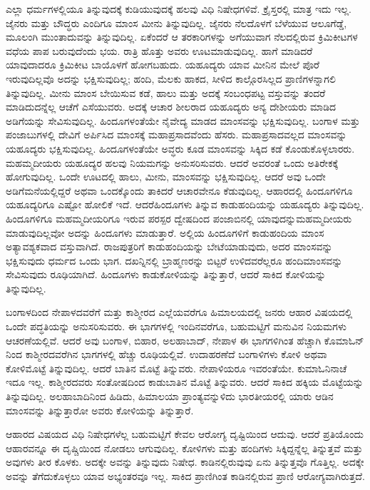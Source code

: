 ಎಲ್ಲಾ ಧರ್ಮಗಳಲ್ಲಿಯೂ ತಿನ್ನುವುದಕ್ಕೆ ಕುಡಿಯುವುದಕ್ಕೆ ಹಲವು ವಿಧಿ ನಿಷೇಧಗಳಿವೆ. ಕ್ರೈಸ್ತರಲ್ಲಿ ಮಾತ್ರ ಇದು ಇಲ್ಲ. ಜೈನರು ಮತ್ತು ಬೌದ್ಧರು ಎಂದಿಗೂ ಮಾಂಸ ಮೀನು ತಿನ್ನುವುದಿಲ್ಲ. ಜೈನರು ನೆಲದೊಳಗೆ ಬೆಳೆಯುವ ಆಲೂಗೆಡ್ಡೆ, ಮೂಲಂಗಿ ಮುಂತಾದುವನ್ನು ತಿನ್ನುವುದಿಲ್ಲ. ಏಕೆಂದರೆ ಆ ತರಕಾರಿಗಳನ್ನು ಅಗೆಯುವಾಗ ನೆಲದಲ್ಲಿರುವ ಕ್ರಿಮಿಕೀಟಗಳ ವಧೆಯ ಪಾಪ ಬರುವುದೆಂದು ಭಯ. ರಾತ್ರಿ ಹೊತ್ತು ಅವರು ಊಟಮಾಡುವುದಿಲ್ಲ. ಹಾಗೆ ಮಾಡಿದರೆ ಯಾವುದಾದರೂ ಕ್ರಿಮಿಕೀಟ ಬಾಯೊಳಗೆ ಹೋಗಬಹುದು. ಯಹೂದ್ಯರು ಯಾವ ಮೀನಿನ ಮೇಲೆ ಪೊರೆ ಇರುವುದಿಲ್ಲವೊ ಅದನ್ನು ಭಕ್ಷಿಸುವುದಿಲ್ಲ; ಹಂದಿ, ಮೆಲಕು ಹಾಕದ, ಸೀಳಿದ ಕಾಲ್ಗೊರಸಿಲ್ಲದ ಪ್ರಾಣಿಗಳನ್ನಾಗಲಿ ತಿನ್ನುವುದಿಲ್ಲ. ಮೀನು ಮಾಂಸ ಬೇಯಿಸುವ ಕಡೆ, ಹಾಲು ಮತ್ತು ಅದಕ್ಕೆ ಸಂಬಂಧಪಟ್ಟ ವಸ್ತುವನ್ನು ತಂದರೆ ಮಾಡಿದುದನ್ನೆಲ್ಲ ಆಚೆಗೆ ಎಸೆಯುವರು. ಅದಕ್ಕೆ ಆಚಾರ ಶೀಲರಾದ ಯಹೂದ್ಯರು ಅನ್ಯ ದೇಶೀಯರು ಮಾಡಿದ ಅಡಿಗೆಯನ್ನು ಸೇವಿಸುವುದಿಲ್ಲ. ಹಿಂದೂಗಳಂತೆಯೇ ನೈವೇದ್ಯ ಮಾಡದ ಮಾಂಸವನ್ನು ಭಕ್ಷಿಸುವುದಿಲ್ಲ. ಬಂಗಾಳ ಮತ್ತು ಪಂಜಾಬುಗಳಲ್ಲಿ ದೇವಿಗೆ ಅರ್ಪಿಸಿದ ಮಾಂಸಕ್ಕೆ ಮಹಾಪ್ರಸಾದವೆಂದು ಹೆಸರು. ಮಹಾಪ್ರಸಾದವಲ್ಲದ ಮಾಂಸವನ್ನು ಯಹೂದ್ಯರು ಭಕ್ಷಿಸುವುದಿಲ್ಲ. ಹಿಂದೂಗಳಂತೆಯೇ ಅವ್ಧರು ಕೂಡ ಮಾಂಸವನ್ನು ಸಿಕ್ಕಿದ ಕಡೆ ಕೊಂಡುಕೊಳ್ಳಲಾರರು. ಮಹಮ್ಮದೀಯರು ಯಹೂದ್ಯರ ಹಲವು ನಿಯಮಗನ್ನು ಅನುಸರಿಸುವರು. ಆದರೆ ಅವರಂತೆ ಒಂದು ಅತಿರೇಕಕ್ಕೆ ಹೋಗುವುದಿಲ್ಲ. ಒಂದೇ ಊಟದಲ್ಲಿ ಹಾಲು, ಮೀನು, ಮಾಂಸವನ್ನು ಭಕ್ಷಿಸುವುದಿಲ್ಲ. ಆದರೆ ಅವು ಒಂದೇ ಅಡಿಗೆಮನೆಯಲ್ಲಿದ್ದರೆ ಅಥವಾ ಒಂದಕ್ಕೊಂದು ತಾಕಿದರೆ ಆಚಾರವೇನೂ ಕೆಡುವುದಿಲ್ಲ. ಆಹಾರದಲ್ಲಿ ಹಿಂದೂಗಳಿಗೂ ಯಹೂದ್ಯರಿಗೂ ಎಷ್ಟೋ ಹೋಲಿಕೆ ಇದೆ. ಆದರೆ\break ಹಿಂದೂಗಳು ತಿನ್ನುವ ಕಾಡುಹಂದಿಯನ್ನು ಯಹೂದ್ಯರು ತಿನ್ನುವುದಿಲ್ಲ. ಹಿಂದೂಗಳಿಗೂ ಮಹಮ್ಮದೀಯರಿಗೂ ಇರುವ ಪರಸ್ಪರ ದ್ವೇಷದಿಂದ ಪಂಜಾಬಿನಲ್ಲಿ ಯಾವುದನ್ನು\break ಮಹಮ್ಮದೀಯರು ಮಾಡುವುದಿಲ್ಲವೋ ಅದನ್ನು ಹಿಂದೂಗಳು ಮಾಡುತ್ತಾರೆ. ಅಲ್ಲಿಯ ಹಿಂದೂಗಳಿಗೆ ಕಾಡುಹಂದಿಯ ಮಾಂಸ ಅತ್ಯಾವಶ್ಯಕವಾದ ವಸ್ತುವಾಗಿದೆ. ರಾಜಪುತ್ರರಿಗೆ ಕಾಡುಹಂದಿಯನ್ನು ಬೇಟೆಯಾಡುವುದು, ಅದರ ಮಾಂಸವನ್ನು ಭಕ್ಷಿಸುವುದು ಧರ್ಮದ ಒಂದು ಭಾಗ. ದಖನ್ನಿನಲ್ಲಿ ಬ್ರಾಹ್ಮಣರನ್ನು ಬಿಟ್ಟರೆ ಉಳಿದವರೆಲ್ಲರೂ ಹಂದಿಮಾಂಸವನ್ನು ಸೇವಿಸುವುದು ರೂಢಿಯಾಗಿದೆ. ಹಿಂದೂಗಳು ಕಾಡುಕೋಳಿಯನ್ನು ತಿನ್ನುತ್ತಾರೆ, ಆದರೆ ಸಾಕಿದ ಕೋಳಿಯನ್ನು ತಿನ್ನುವುದಿಲ್ಲ.

ಬಂಗಾಳದಿಂದ ನೇಪಾಳದವರೆಗೆ ಮತ್ತು ಕಾಶ್ಮೀರದ ಎಲ್ಲೆಯವರೆಗೂ ಹಿಮಾಲಯದಲ್ಲಿ ಜನರು ಆಹಾರ ವಿಷಯದಲ್ಲಿ ಒಂದೇ ಪದ್ಧತಿಯನ್ನು ಅನುಸರಿಸುವರು. ಈ ಭಾಗಗಳಲ್ಲಿ ಇಂದಿನವರೆಗೂ, ಬಹುಮಟ್ಟಿಗೆ ಮನುವಿನ ನಿಯಮಗಳು ಆಚರಣೆಯಲ್ಲಿವೆ. ಆದರೆ ಅವು ಬಂಗಾಳ, ಬಿಹಾರ, ಅಲಹಾಬಾದ್​, ನೇಪಾಳ ಈ ಭಾಗಗಳಿಗಿಂತ ಹೆಚ್ಚಾಗಿ ಕೊಮಾಓನ್​ನಿಂದ ಕಾಶ್ಮೀರದವರೆಗಿನ ಭಾಗಗಳಲ್ಲಿ ಹೆಚ್ಚು ರೂಢಿಯಲ್ಲಿವೆ. ಉದಾಹರಣೆದೆ ಬಂಗಾಳಿಗಳು ಕೋಳಿ ಅಥವಾ ಕೋಳಿಮೊಟ್ಟೆ ತಿನ್ನುವುದಿಲ್ಲ. ಆದರೆ ಬಾತಿನ ಮೊಟ್ಟೆ ತಿನ್ನುವರು. ನೇಪಾಳಿಯರೂ ಇವರಂತೆಯೇ. ಕುಮಾಓನಿನಾಚೆ ಇದೂ ಇಲ್ಲ. ಕಾಶ್ಮೀರ\break ದವರು ಸಂತೋಷದಿಂದ ಕಾಡುಬಾತಿನ ಮೊಟ್ಟೆ ತಿನ್ನುವರು. ಆದರೆ ಸಾಕಿದ ಹಕ್ಕಿಯ ಮೊಟ್ಟೆಯನ್ನು ತಿನ್ನುವುದಿಲ್ಲ. ಅಲಹಾಬಾದಿನಿಂದ ಹಿಡಿದು, ಹಿಮಾಲಯಾ ಪ್ರಾಂತ್ಯವನ್ನು\break ಳಿದು ಭಾರತೀಯರಲ್ಲಿ ಯಾರು ಆಡಿನ ಮಾಂಸವನ್ನು ತಿನ್ನುತ್ತಾರೋ ಅವರು ಕೋಳಿಯನ್ನು ತಿನ್ನುತ್ತಾರೆ.

ಆಹಾರದ ವಿಷಯದ ವಿಧಿ ನಿಷೇಧಗಳೆಲ್ಲ ಬಹುಮಟ್ಟಿಗೆ ಕೇವಲ ಆರೋಗ್ಯ ದೃಷ್ಟಿಯಿಂದ ಆದುವು. ಆದರೆ ಪ್ರತಿಯೊಂದು ಆಹಾರವನ್ನೂ ಈ ದೃಷ್ಚಿಯಿಂದ ನೋಡಲು ಆಗುವುದಿಲ್ಲ. ಕೋಳಿಗಳು ಮತ್ತು ಹಂದಿಗಳು ಸಿಕ್ಕಿದ್ದನ್ನೆಲ್ಲ ತಿನ್ನುತ್ತವೆ ಮತ್ತು ಅವುಗಳು ತೀರ ಕೊಳಕು. ಅದಕ್ಕೇ ಅವನ್ನು ತಿನ್ನುವುದು ನಿಷೇಧ. ಕಾಡಿನಲ್ಲಿರುವುವು ಏನು ತಿನ್ನುತ್ತವೊ ಗೊತ್ತಿಲ್ಲ. ಅದಕ್ಕೇ ಅವನ್ನು ತೆಗೆದುಕೊಳ್ಳಲು ಯಾವ ಅಭ್ಯಂತರವೂ ಇಲ್ಲ. ಸಾಕಿದ ಪ್ರಾಣಿಗಿಂತ ಕಾಡಿನಲ್ಲಿರುವ ಪ್ರಾಣಿ ಆರೋಗ್ಯವಾಗಿರುತ್ತದೆ.

